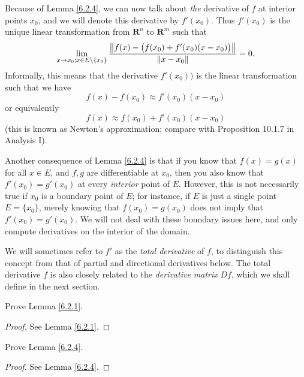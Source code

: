 \begin{note}
    Because of Lemma \ref{6.2.4}, we can now talk about \emph{the} derivative of \(f\) at interior points \(x_0\), and we will denote this derivative by \(f'(x_0)\).
    Thus \(f'(x_0)\) is the unique linear transformation from \(\mathbf{R}^n\) to \(\mathbf{R}^m\) such that
    \[
        \lim_{x \to x_0 ; x \in E \setminus \{x_0\}} \frac{\norm*{f(x) - \big(f(x_0) + f'(x_0)(x - x_0)\big)}}{\norm*{x - x_0}} = 0.
    \]
    Informally, this means that the derivative \(f'(x_0))\) is the linear transformation such that we have
    \[
        f(x) - f(x_0) \approx f'(x_0)(x - x_0)
    \]
    or equivalently
    \[
        f(x) \approx f(x_0) + f'(x_0)(x - x_0)
    \]
    (this is known as Newton's approximation;
    compare with Proposition 10.1.7 in Analysis I).
\end{note}

\begin{note}
    Another consequence of Lemma \ref{6.2.4} is that if you know that \(f(x) = g(x)\) for all \(x \in E\), and \(f, g\) are differentiable at \(x_0\), then you also know that \(f'(x_0) = g'(x_0)\) at every \emph{interior} point of \(E\).
    However, this is not necessarily true if \(x_0\) is a boundary point of \(E\);
    for instance, if \(E\) is just a single point \(E = \{x_0\}\), merely knowing that \(f(x_0) = g(x_0)\) does not imply that \(f'(x_0) = g'(x_0)\).
    We will not deal with these boundary issues here, and only compute derivatives on the interior of the domain.
\end{note}

\begin{note}
    We will sometimes refer to \(f'\) as the \emph{total derivative} of \(f\), to distinguish this concept from that of partial and directional derivatives below.
    The total derivative \(f\) is also closely related to the \emph{derivative matrix} \(Df\),
    which we shall define in the next section.
\end{note}

\exercisesection

\begin{exercise}\label{ex 6.2.1}
    Prove Lemma \ref{6.2.1}.
\end{exercise}

\begin{proof}
    See Lemma \ref{6.2.1}.
\end{proof}

\begin{exercise}\label{ex 6.2.2}
    Prove Lemma \ref{6.2.4}.
\end{exercise}

\begin{proof}
    See Lemma \ref{6.2.4}.
\end{proof}